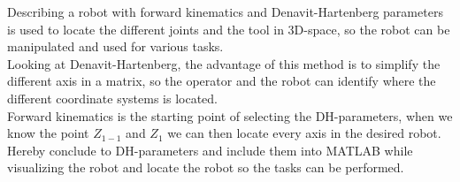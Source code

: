 Describing a robot with forward kinematics and Denavit-Hartenberg parameters is used to locate the different joints and the tool in 3D-space, so the robot can be manipulated and used for various tasks.\\
Looking at Denavit-Hartenberg, the advantage of this method is to simplify the different axis in a matrix, so the operator and the robot can identify where the different coordinate systems is located.\\
Forward kinematics is the starting point of selecting the DH-parameters, when we know the point $Z_{1-1}$ and $Z_1$ we can then locate every axis in the desired robot. Hereby conclude to DH-parameters and include them into MATLAB while visualizing the robot and locate the robot so the tasks can be performed.\\